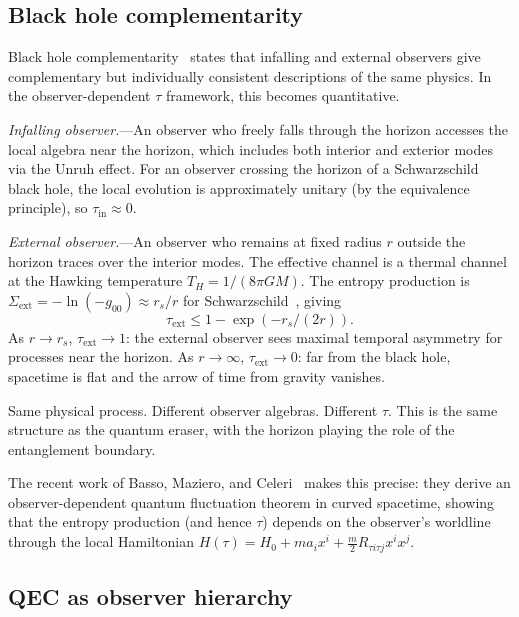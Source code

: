 \documentclass[prl,twocolumn,superscriptaddress,longbibliography,floatfix]{revtex4-2}
\newcommand{\tauasym}{\tau}
\begin{document}
\subsection{Black hole complementarity}
\label{sec:bh}

Black hole complementarity~\cite{Susskind1993} states that
infalling and external observers give complementary but
individually consistent descriptions of the same physics.
In the observer-dependent $\tauasym$ framework, this becomes
quantitative.

\emph{Infalling observer.}---An observer who freely falls
through the horizon accesses the local algebra near the horizon,
which includes both interior and exterior modes via the
Unruh effect. For an observer crossing the horizon of a
Schwarzschild black hole, the local evolution is approximately
unitary (by the equivalence principle), so
$\tauasym_{\mathrm{in}} \approx 0$.

\emph{External observer.}---An observer who remains at
fixed radius $r$ outside the horizon traces over the interior
modes.  The effective channel is a thermal channel at the
Hawking temperature $T_H = 1/(8\pi G M)$.  The entropy
production is $\Sigma_{\mathrm{ext}} = -\ln(-g_{00})
\approx r_s/r$ for Schwarzschild~\cite{Paper2}, giving
\begin{equation}
\tauasym_{\mathrm{ext}} \leq 1 - \exp(-r_s/(2r)).
\label{eq:tau_bh}
\end{equation}
As $r \to r_s$, $\tauasym_{\mathrm{ext}} \to 1$: the external
observer sees maximal temporal asymmetry for processes near the
horizon.  As $r \to \infty$, $\tauasym_{\mathrm{ext}} \to 0$:
far from the black hole, spacetime is flat and the arrow of
time from gravity vanishes.

Same physical process.  Different observer algebras.  Different
$\tauasym$.  This is the same structure as the quantum eraser,
with the horizon playing the role of the entanglement boundary.

The recent work of Basso, Maziero, and
Celeri~\cite{BassoCeleri2025} makes this precise: they derive
an observer-dependent quantum fluctuation theorem in curved
spacetime, showing that the entropy production (and hence
$\tauasym$) depends on the observer's worldline through the
local Hamiltonian $H(\tau) = H_0 + m a_i x^i +
\tfrac{m}{2} R_{\tau i \tau j} x^i x^j$.


\subsection{QEC as observer hierarchy}
\label{sec:qec}
\end{document}

